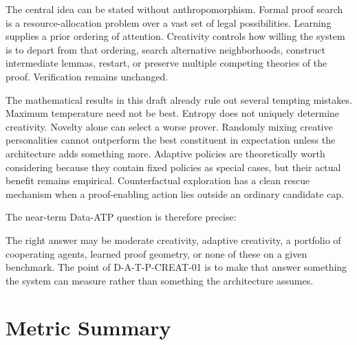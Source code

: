 \documentclass[11pt]{article}
\theoremstyle{datatheorem}
\theoremstyle{definition}
\begin{document}
The central idea can be stated without anthropomorphism. Formal proof search is a resource-allocation problem over a vast set of legal possibilities. Learning supplies a prior ordering of attention. Creativity controls how willing the system is to depart from that ordering, search alternative neighborhoods, construct intermediate lemmas, restart, or preserve multiple competing theories of the proof. Verification remains unchanged.

The mathematical results in this draft already rule out several tempting mistakes. Maximum temperature need not be best. Entropy does not uniquely determine creativity. Novelty alone can select a worse prover. Randomly mixing creative personalities cannot outperform the best constituent in expectation unless the architecture adds something more. Adaptive policies are theoretically worth considering because they contain fixed policies as special cases, but their actual benefit remains empirical. Counterfactual exploration has a clean rescue mechanism when a proof-enabling action lies outside an ordinary candidate cap.

The near-term Data-ATP question is therefore precise:
\begin{center}
\end{center}
The right answer may be moderate creativity, adaptive creativity, a portfolio of cooperating agents, learned proof geometry, or none of these on a given benchmark. The point of D-A-T-P-CREAT-01 is to make that answer something the system can measure rather than something the architecture assumes.

\clearpage
\appendix
\section{Metric Summary}
\end{document}
